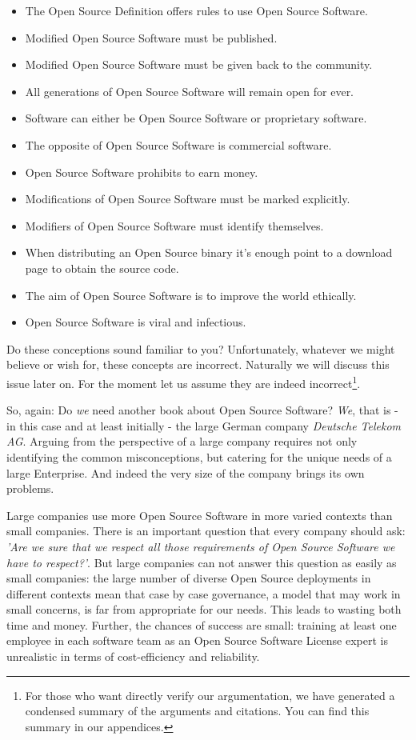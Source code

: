 \begin{itemize}
  \item The Open Source Definition offers rules to use Open Source Software.
  \item Modified Open Source Software must be published.
  \item Modified Open Source Software must be given back to the community.
  \item All generations of Open Source Software will remain open for ever.
  \item Software can either be Open Source Software or proprietary software.
  \item The opposite of Open Source Software is commercial software.
  \item Open Source Software prohibits to earn money.
  \item Modifications of Open Source Software must be marked explicitly.
  \item Modifiers of Open Source Software must identify themselves.
  \item When distributing an Open Source binary it’s enough point to a download
  page to obtain the source code.
  \item The aim of Open Source Software is to improve the world ethically.
  \item Open Source Software is viral and infectious.
\end{itemize}

Do these conceptions sound familiar to you? Unfortunately, whatever we might
believe or wish for, these concepts are incorrect. Naturally we will discuss
this issue later on. For the moment let us assume they are indeed
incorrect\footnote{For those who want directly verify our argumentation, we have
generated a condensed summary of the arguments and citations. You can find this
summary in our appendices.}.

So, again: Do \emph{we} need another book about Open Source Software? \emph{We},
that is - in this case and at least initially - the large German company
\textit{Deutsche Telekom AG}. Arguing from the perspective of a large company
requires not only identifying the common misconceptions, but catering for the
unique needs of a large Enterprise. And indeed the very size of the company
brings its own problems.

Large companies use more Open Source Software in more varied contexts than small
companies. There is an important question that every company should ask:
\emph{'Are we sure that we respect all those requirements of Open Source
Software we have to respect?'}. But large companies can not answer this question
as easily as small companies: the large number of diverse Open Source
deployments in different contexts mean that case by case governance, a model
that may work in small concerns, is far from appropriate for our needs. This
leads to wasting both time and money. Further, the chances of success are small:
training at least one employee in each software team as an Open Source Software
License expert is unrealistic in terms of cost-efficiency and reliability.

